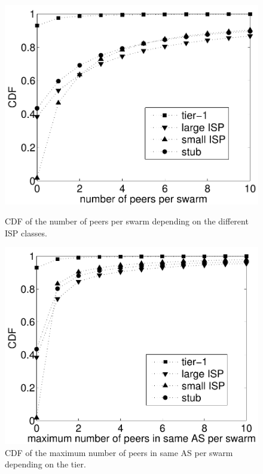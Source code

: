 \begin{figure}[bt]
\begin{minipage}[b]{0.49\textwidth}
	\centering
	\includegraphics[width=\textwidth]{aslevel/p2p/methodology/figs/CDF_npeers_perswarm}
 	\caption{CDF of the number of peers per swarm depending on the different ISP classes.}
 	\label{fig:CDF_npeers_perswarm}
\end{minipage}
\hspace{0.01\textwidth}
\begin{minipage}[b]{0.49\textwidth}
	\centering
	\includegraphics[width=\textwidth]{aslevel/p2p/methodology/figs/CDF_maxpeers_perswarm_perAS}
 	\caption{CDF of the maximum number of peers in same AS per swarm depending on the tier.}
 	\label{fig:CDF_maxpeers_perswarm_perAS}
\end{minipage}
\end{figure}


